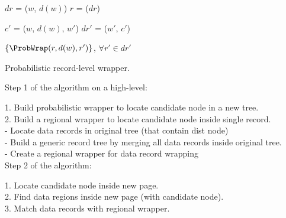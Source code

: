 \IncMargin{2em}
\begin{algorithm}[h]

	\DontPrintSemicolon

	\BlankLine

	$dr$ = \LocateDataRegionContainingNode($w$, $d(w)$) \;
	$r$ = \MergeDataRecords($dr$) \;

	$c'$ = \ProbWrap($w$, $d(w)$, $w'$) \;
	$dr'$ = \LocateDataRegionContainingNode($w'$, $c'$) \;

	\Return $\left\{ \ProbWrap(r, d(w), r') \right\}$, $\forall r' \in dr'$ \;

	\caption{Probabilistic record-level wrapper.}

\end{algorithm}
\DecMargin{2em}

Step 1 of the algorithm on a high-level:

1. Build probabilistic wrapper to locate candidate node in a new tree.\\
2. Build a regional wrapper to locate candidate node inside single record.\\
   - Locate data records in original tree (that contain dist node)\\
   - Build a generic record tree by merging all data records inside original tree.\\
   - Create a regional wrapper for data record wrapping\\

Step 2 of the algorithm:

1. Locate candidate node inside new page.\\
2. Find data regions inside new page (with candidate node).\\
3. Match data records with regional wrapper.\\



